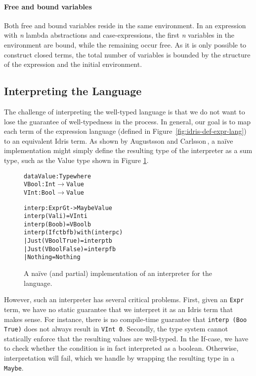 \paragraph{Free and bound variables} Both free and bound variables reside in the same environment. In an expression with \textit{n} lambda abstractions and case-expressions, the first \textit{n} variables in the environment are bound, while the remaining occur free. As it is only possible to construct closed terms, the total number of variables is bounded by the structure of the expression and the initial environment.

\subsection{Interpreting the Language}
The challenge of interpreting the well-typed language is that we do not want to lose the guarantee of well-typedness in the process. In general, our goal is to map each term of the expression language (defined in Figure~\ref{fig:idris-def-expr-lang}) to an equivalent Idris term. As shown by Augustsson and Carlsson\,\cite{Augustsson99anexercise}, a na\"{i}ve implementation might simply define the resulting type of the interpreter as a sum type, such as the Value type shown in Figure \ref{fig:naive-interpreter-impl}.

\begin{figure}
\begin{alltt}
data Value : Type where
  VBool : Int \(\rightarrow\) Value
  VInt  : Bool \(\rightarrow\) Value

interp : Expr G t -> Maybe Value
interp (Val i) = VInt i
interp (Boo b) = VBool b
interp (If c tb fb) with (interp c)
  | Just (VBool True)  = interp tb
  | Just (VBool False) = interp fb
  | Nothing            = Nothing
\end{alltt}
\caption{A na\"{i}ve (and partial) implementation of an interpreter for the language.}
\label{fig:naive-interpreter-impl}
\end{figure}

However, such an interpreter has several critical problems. First, given an \texttt{Expr} term, we have no static guarantee that we interpret it as an Idris term that makes sense. For instance, there is no compile-time guarantee that \texttt{interp (Boo True)} does not always result in \texttt{VInt 0}. Secondly, the type system cannot statically enforce that the resulting values are well-typed. In the If-case, we have to check whether the condition is in fact interpreted as a boolean. Otherwise, interpretation will fail, which we handle by wrapping the resulting type in a \texttt{Maybe}.

